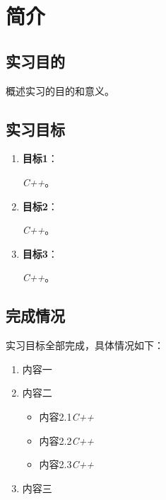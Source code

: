 \section{简介}
\subsection{实习目的}
概述实习的目的和意义。

\subsection{实习目标}
\begin{enumerate}
    \item \textbf{目标1}：
    
    \textit{C++}。

    \item \textbf{目标2}：
    
    \textit{C++}。

    \item \textbf{目标3}：
    
    \textit{C++}。
\end{enumerate}

\subsection{完成情况}
    实习目标全部完成，具体情况如下：
    \begin{enumerate}
        \item 内容一
        \item 内容二
        \begin{itemize}
            \item 内容2.1\textit{C++}
            \item 内容2.2\textit{C++}
            \item 内容2.3\textit{C++}
        \end{itemize}
        \item 内容三
    \end{enumerate}
